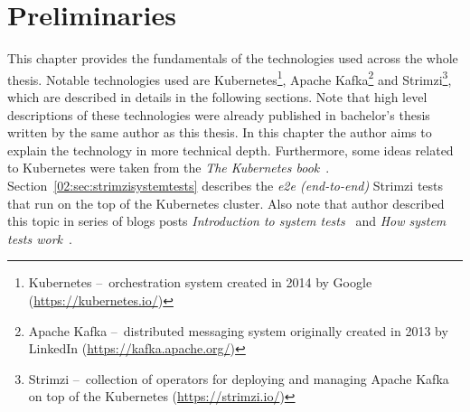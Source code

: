 \chapter{Preliminaries}
\label{02:chapter:title}

This chapter provides the fundamentals of the technologies used across the whole thesis.
Notable technologies used are Kubernetes\footnote{Kubernetes \---\ orchestration system created in 2014 by Google (\url{https://kubernetes.io/})}, Apache Kafka\footnote{Apache Kafka \---\ distributed messaging system originally created in 2013 by LinkedIn (\url{https://kafka.apache.org/})} and Strimzi\footnote{Strimzi \---\ collection of operators for deploying and managing Apache Kafka on top of the Kubernetes (\url{https://strimzi.io/})}, which are described in details in the following sections.
Note that high level descriptions of these technologies were already published in bachelor's thesis~\cite{02-bachelor-thesis} written by the same author as this thesis.
In this chapter the author aims to explain the technology in more technical depth.
Furthermore, some ideas related to Kubernetes were taken from the \emph{The Kubernetes book}~\cite{kubernetesBook}.
Section~\ref{02:sec:strimzisystemtests} describes the \emph{e2e (end-to-end)}  Strimzi tests that run on the top of the Kubernetes cluster.
Also note that author described this topic in series of blogs posts \emph{Introduction to system tests}~\cite{02-blogpost-introduction-to-systemtest} and \emph{How system tests work}~\cite{02-blogpost-how-systemtest-work}.